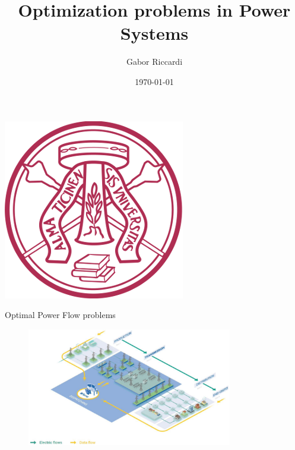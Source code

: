 \documentclass[11pt, aspectratio=169]{beamer}
\title{Optimization problems in Power Systems}
\author{Gabor Riccardi}
\date{\today}
\institute{Università di Pavia}
\begin{document}
\begin{frame}[plain]
\centering
\includegraphics[scale=0.5]{unipv.png}
\maketitle
\end{frame}

\begin{frame}{Optimal Power Flow problems}
    \begin{figure}
        \centering
        \includegraphics[width=0.8\textwidth]{photo_2023-09-26_14-27-16.jpg}
        \label{fig:enter-label}
    \end{figure}
\end{frame}


\begin{frame}
	\tableofcontents
\end{frame}




\end{document}
